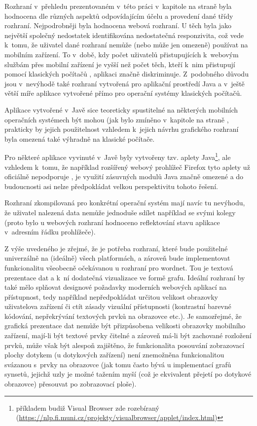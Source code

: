 \documentclass[a4paper,11pt,openany,twoside]{book}
\newcommand{\itNameRef}[1]{\textit{\nameref{#1}}}
\begin{document}
			Rozhraní v~přehledu prezentovaném v~této práci v~kapitole \itNameRef{cha:porovnani} na straně \pageref{cha:porovnani} byla hodnocena dle různých aspektů odpovídajícím účelu a provedení dané třídy rozhraní. Nejpodrobněji byla hodnocena webová rozhraní. U těch byla jako největší společný nedostatek identifikována nedostatečná responzivita, což vede k~tomu, že uživatel dané rozhraní nemůže (nebo může jen omezeně) používat na mobilním zařízení. To v~době, kdy počet uživatelů přistupujících k~webovým službám přes mobilní zařízení je vyšší než počet těch, kteří k~nim přistupují pomocí klasických počítačů \parencite{Heisler2016}, aplikaci značně diskriminuje. Z~podobného důvodu jsou v~nevýhodě také rozhraní vytvořená pro aplikační prostředí Java a v~ještě větší míře aplikace vytvořené přímo pro operační systémy klasických počítačů. 

			Aplikace vytvořené v~Javě sice teoreticky spustitelné na některých mobilních operačních systémech být mohou (jak bylo zmíněno v~kapitole \itNameRef{cha:structhodnoc} na straně \pageref{cha:structhodnoc}, prakticky by jejich použitelnost vzhledem k~jejich návrhu grafického rozhraní byla omezená také výhradně na klasické počítače. 

			Pro některé aplikace vyvinuté v~Javě byly vytvořeny tzv. aplety Java\footnote{příkladem budiž Visual Browser zde rozebíraný (\url{https://nlp.fi.muni.cz/projekty/visualbrowser/applet/index.html})}, ale vzhledem k~tomu, že například rozšířený webový prohlížeč Firefox tyto aplety už oficiálně nepodporuje \parencite{MozzilaFoundation2017}, je využití zásuvných modulů Java značně omezené a do budoucnosti asi nelze předpokládat velkou perspektivitu tohoto řešení.

			Rozhraní zkompilovaná pro konkrétní operační systém mají navíc tu nevýhodu, že uživatel nalezená data nemůže jednoduše sdílet například se svými kolegy (proto bylo u webových rozhraní hodnoceno reflektování stavu aplikace v~adresním řádku prohlížeče). 

			Z výše uvedeného je zřejmé, že je potřeba rozhraní, které bude použitelné univerzálně na (ideálně) všech platformách, a zároveň bude implementovat funkcionalitu všeobecně očekávanou u rozhraní pro wordnet. Tou je textová prezentace dat a k~ní dodatečná vizualizace ve formě grafu. Ideální rozhraní by také mělo splňovat designové požadavky moderních webových aplikací na přístupnost, tedy například nepředpokládat určitou velikost obrazovky uživatelova zařízení či ctít zásady vizuální přístupnosti (kontrastní barevné kódování, nepřekrývání textových prvků na obrazovce etc.). Je samozřejmé, že grafická prezentace dat nemůže být přizpůsobena velikosti obrazovky mobilního zařízení, mají-li být textové prvky čitelné a zároveň má-li být zachované rozložení prvků, může však být alespoň zajištěno, že funkcionalita posouvání zobrazovací plochy dotykem (u dotykových zařízení) není znemožněna funkcionalitou svázanou s~prvky na obrazovce (jak tomu často bývá u implementací grafů synsetů, jejichž uzly je možné tažením myší (což je ekvivalent přejetí po dotykové obrazovce) přesouvat po zobrazovací ploše). 
\end{document}
